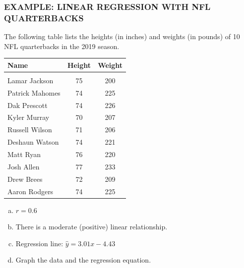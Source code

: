 \documentclass[8pt]{beamer}
\newcommand{\extitle}[1]{\frametitle{\fontfamily{fvs}\selectfont \small\color{black!70!blue!80!cyan}\uppercase{\bfseries Example: #1}}}
\begin{document}
\begin{frame}
\extitle{Linear Regression with NFL Quarterbacks}
The following table lists the heights (in inches) and weights (in pounds) of 10 NFL quarterbacks in the 2019 season.
{\footnotesize\begin{center}
\begin{tabular}{l c c}
\textbf{Name} & \textbf{Height} & \textbf{Weight}\\
\hline
& & \\
Lamar Jackson & 75 & 200\\
Patrick Mahomes & 74 & 225\\
Dak Prescott & 74 & 226\\
Kyler Murray & 70 & 207\\
Russell Wilson & 71 & 206\\
Deshaun Watson & 74 & 221\\
Matt Ryan & 76 & 220\\
Josh Allen & 77 & 233\\
Drew Brees & 72 & 209\\
Aaron Rodgers & 74 & 225\\
\end{tabular}
\end{center}}
\begin{enumerate}[(a)]
\item $r = 0.6$
\item There is a moderate (positive) linear relationship.
\item Regression line: $\hat{y} = 3.01x - 4.43$
\item Graph the data and the regression equation.
\end{enumerate}
\vspace{3in}
\text{}
\end{frame}
\end{document}
